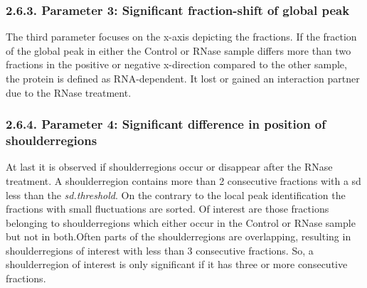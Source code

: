 \documentclass[
  12pt,
]{article}
\begin{document}
\hypertarget{parameter-3-significant-fraction-shift-of-global-peak}{%
\subsubsection{2.6.3. Parameter 3: Significant fraction-shift of global
peak}\label{parameter-3-significant-fraction-shift-of-global-peak}}

\renewcommand{\section}{\titlespacing*{\section}{0pt}{0.3\baselineskip}{0.2\baselineskip}\section}

The third parameter focuses on the x-axis depicting the fractions. If
the fraction of the global peak in either the Control or RNase sample
differs more than two fractions in the positive or negative x-direction
compared to the other sample, the protein is defined as RNA-dependent.
It lost or gained an interaction partner due to the RNase treatment.

\hypertarget{parameter-4-significant-difference-in-position-of-shoulderregions}{%
\subsubsection{2.6.4. Parameter 4: Significant difference in position of
shoulderregions}\label{parameter-4-significant-difference-in-position-of-shoulderregions}}

\renewcommand{\section}{\titlespacing*{\section}{0pt}{0.3\baselineskip}{0.2\baselineskip}\section}

At last it is observed if shoulderregions occur or disappear after the
RNase treatment. A shoulderregion contains more than 2 consecutive
fractions with a sd less than the \emph{sd.threshold}. On the contrary
to the local peak identification the fractions with small fluctuations
are sorted. Of interest are those fractions belonging to shoulderregions
which either occur in the Control or RNase sample but not in both.Often
parts of the shoulderregions are overlapping, resulting in
shoulderregions of interest with less than 3 consecutive fractions. So,
a shoulderregion of interest is only significant if it has three or more
consecutive fractions.
\end{document}
